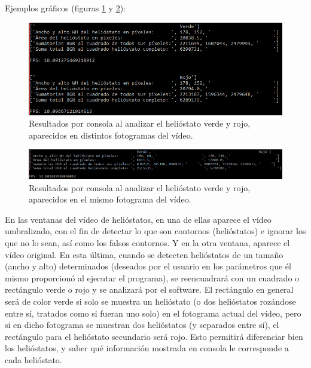 Ejemplos gráficos (figuras \ref{fig:CapturasEntradasYSalidas/Captura(2).PNG} y \ref{fig:CapturasEntradasYSalidas/Captura(3).PNG}):

\begin{figure}[h!]
  	\centering
	\includegraphics[width=\textwidth]{CapturasEntradasYSalidas/Captura(2).PNG}
	\caption{Resultados por consola al analizar el helióstato verde y rojo, aparecidos en distintos fotogramas del vídeo.
	\label{fig:CapturasEntradasYSalidas/Captura(2).PNG}}
\end{figure}

\begin{figure}[h!]
  	\centering
	\includegraphics[width=\textwidth]{CapturasEntradasYSalidas/Captura(3).PNG}
	\caption{Resultados por consola al analizar el helióstato verde y rojo, aparecidos en el mismo fotograma del vídeo.
	\label{fig:CapturasEntradasYSalidas/Captura(3).PNG}}
\end{figure}

En las ventanas del vídeo de helióstatos, en una de ellas aparece el vídeo umbralizado, con el fin de detectar lo que son contornos (helióstatos) e ignorar los que no lo sean, así como los falsos contornos. Y en la otra ventana, aparece el vídeo original. En esta última, cuando se detecten helióstatos de un tamaño (ancho y alto) determinados (deseados por el usuario en los parámetros que él mismo proporcionó al ejecutar el programa), se reencuadrará con un cuadrado o rectángulo verde o rojo y se analizará por el software. El rectángulo en general será de color verde si solo se muestra un helióstato (o dos helióstatos rozándose entre sí, tratados como si fueran uno solo) en el fotograma actual del vídeo, pero si en dicho fotograma se muestran dos helióstatos (y separados entre sí), el rectángulo para el helióstato secundario será rojo. Esto permitirá diferenciar bien los helióstatos, y saber qué información mostrada en consola le corresponde a cada helióstato.

